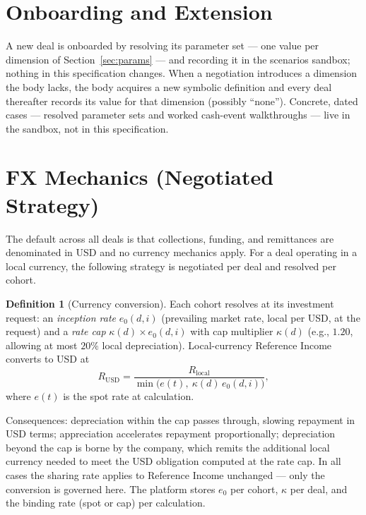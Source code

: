 \documentclass[11pt, a4paper]{article}
\theoremstyle{definition}
\newtheorem{definition}{Definition}[section]
\begin{document}
\section{Onboarding and Extension}\label{sec:onboard}

A new deal is onboarded by resolving its parameter set --- one value per dimension of Section~\ref{sec:params} --- and recording it in the scenarios sandbox; nothing in this specification changes. When a negotiation introduces a dimension the body lacks, the body acquires a new symbolic definition and every deal thereafter records its value for that dimension (possibly ``none''). Concrete, dated cases --- resolved parameter sets and worked cash-event walkthroughs --- live in the sandbox, not in this specification.

\section{FX Mechanics (Negotiated Strategy)}\label{sec:fx}

The default across all deals is that collections, funding, and remittances are denominated in USD and no currency mechanics apply. For a deal operating in a local currency, the following strategy is negotiated per deal and resolved per cohort.

\begin{definition}[Currency conversion]\label{def:fx}
Each cohort resolves at its investment request: an \emph{inception rate} $e_0(d, i)$ (prevailing market rate, local per USD, at the request) and a \emph{rate cap} $\kappa(d) \times e_0(d, i)$ with cap multiplier $\kappa(d)$ (e.g., $1.20$, allowing at most $20\%$ local depreciation). Local-currency Reference Income converts to USD at
\[
R_{\mathrm{USD}} = \frac{R_{\mathrm{local}}}{\min\bigl(e(t),\ \kappa(d)\, e_0(d,i)\bigr)},
\]
where $e(t)$ is the spot rate at calculation.
\end{definition}

Consequences: depreciation within the cap passes through, slowing repayment in USD terms; appreciation accelerates repayment proportionally; depreciation beyond the cap is borne by the company, which remits the additional local currency needed to meet the USD obligation computed at the rate cap. In all cases the sharing rate applies to Reference Income unchanged --- only the conversion is governed here. The platform stores $e_0$ per cohort, $\kappa$ per deal, and the binding rate (spot or cap) per calculation.
\end{document}
